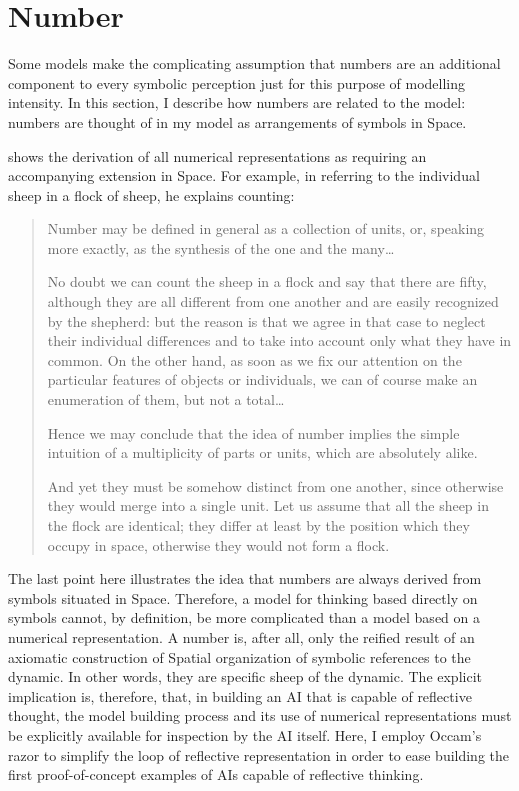 \section{Number}
\label{section:number}

Some models make the complicating assumption that numbers are an
additional component to every symbolic perception just for this
purpose of modelling intensity.  In this section, I describe how
numbers are related to the model: numbers are thought of in my model
as arrangements of symbols in Space.

\cite{bergson:1910} shows the derivation of all numerical
representations as requiring an accompanying extension in Space.  For
example, in referring to the individual sheep in a flock of sheep, he
explains counting:

\begin{quote}
Number may be defined in general as a collection of units, or,
speaking more exactly, as the synthesis of the one and the
many\ldots

No doubt we can count the sheep in a flock and say that there are
fifty, although they are all different from one another and are easily
recognized by the shepherd: but the reason is that we agree in that
case to neglect their individual differences and to take into account
only what they have in common.  On the other hand, as soon as we fix
our attention on the particular features of objects or individuals, we
can of course make an enumeration of them, but not a total\ldots

Hence we may conclude that the idea of number implies the simple
intuition of a multiplicity of parts or units, which are absolutely
alike.

And yet they must be somehow distinct from one another, since
otherwise they would merge into a single unit.  Let us assume that all
the sheep in the flock are identical; they differ at least by the
position which they occupy in space, otherwise they would not form a
flock.
\end{quote}

The last point here illustrates the idea that numbers are always
derived from symbols situated in Space.  Therefore, a model for
thinking based directly on symbols cannot, by definition, be more
complicated than a model based on a numerical representation.  A
number is, after all, only the reified result of an axiomatic
construction of Spatial organization of symbolic references to the
dynamic.  In other words, they are specific sheep of the dynamic.  The
explicit implication is, therefore, that, in building an AI that is
capable of reflective thought, the model building process and its use
of numerical representations must be explicitly available for
inspection by the AI itself.  Here, I employ Occam's razor to simplify
the loop of reflective representation in order to ease building the
first proof-of-concept examples of AIs capable of reflective thinking.

